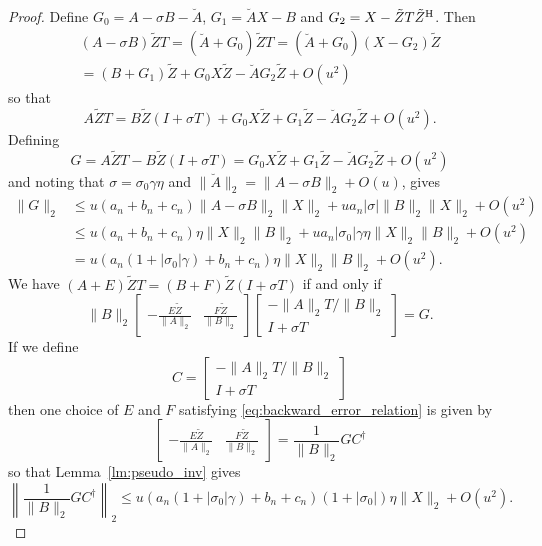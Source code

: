 \documentclass[12pt]{article}
\def\H{{\rm H}}
\begin{document}
\begin{proof}
  Define $G_0 = A-\sigma B - \breve{A}$, $G_1 = \breve{A} X - B$ and $G_2 = X - \tilde{Z}T\tilde{Z}^\H$.  Then
  \begin{multline*}
    (A-\sigma B) \tilde{Z} T 
    = (\breve{A} + G_0) \tilde{Z}T
    = (\breve{A} + G_0) (X - G_2)\tilde{Z} \\
    = (B+G_1)\tilde{Z} + G_0 X\tilde{Z} - \breve{A}G_2 \tilde{Z} + O(u^2)
  \end{multline*}
  so that
  \begin{equation*}
    A \tilde{Z} T= B \tilde{Z} (I+\sigma T) + G_0 X \tilde{Z} + G_1 \tilde{Z} - \breve{A}G_2 \tilde{Z} + O(u^2).
  \end{equation*}
  Defining
  \begin{equation*}
    G = A \tilde{Z} T - B \tilde{Z} (I+\sigma T) = G_0 X \tilde{Z} + G_1 \tilde{Z} - \breve{A}G_2 \tilde{Z}+O(u^2)
  \end{equation*}
  and noting that $\sigma = \sigma_0 \gamma \eta$ and $\|\breve{A}\|_2 = \|A-\sigma B\|_2+ O(u)$, gives
  \begin{align*}
    \|G\|_2 & \leq u (a_n+b_n+c_n) \|A-\sigma B\|_2 \|X\|_2 + u a_n |\sigma| \|B\|_2 \|X\|_2 +O(u^2)\\
            & \leq u(a_n + b_n+c_n) \eta \|X\|_2 \|B\|_2
              + u a_n |\sigma_0| \gamma \eta \|X\|_2 \|B\|_2 +O(u^2)\\
            & = u (a_n(1+|\sigma_0|\gamma) + b_n + c_n)\eta\|X\|_2 \|B\|_2 +O(u^2).
  \end{align*}
  We have $(A+E)\tilde{Z}T = (B+F)\tilde{Z}(I+\sigma T)$ if and only if
  \begin{equation}
    \label{eq:backward_error_relation}
    \|B\|_2 \begin{bmatrix}
      -\frac{E\tilde{Z}}{\|A\|_2} & \frac{F\tilde{Z}}{\|B\|_2}
    \end{bmatrix}
    \begin{bmatrix}
      -\|A\|_2 T / \|B\|_2 \\ I + \sigma T
    \end{bmatrix}
    = G.
  \end{equation}
  If we define
  \begin{equation*}
    C
    =
    \begin{bmatrix}
      -\|A\|_2 T / \|B\|_2 \\ I + \sigma T
    \end{bmatrix}
  \end{equation*}
  then one choice of $E$ and $F$ satisfying \eqref{eq:backward_error_relation} is given
  by
  \begin{equation*}
    \begin{bmatrix}
      -\frac{E\tilde{Z}}{\|A\|_2} & \frac{F\tilde{Z}}{\|B\|_2}
    \end{bmatrix} = \frac{1}{\|B\|_2} G C^{\dagger}
  \end{equation*}
  so that Lemma~\ref{lm:pseudo_inv} gives
  \begin{equation*}
    \left\| \frac{1}{\|B\|_2} G C^{\dagger}\right\|_2 \leq 
    u (a_n(1+|\sigma_0|\gamma) + b_n + c_n)(1+|\sigma_0|) \eta\|X\|_2 +O(u^2).
  \end{equation*}
\end{proof}
\end{document}
